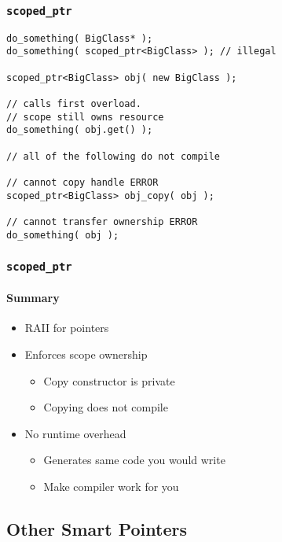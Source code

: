 \begin{frame}[fragile]
    \frametitle{\texttt{scoped\_ptr}}
    \begin{lstlisting}[title=Compile time enforcement]
do_something( BigClass* );
do_something( scoped_ptr<BigClass> ); // illegal

scoped_ptr<BigClass> obj( new BigClass );

// calls first overload.
// scope still owns resource
do_something( obj.get() );

// all of the following do not compile

// cannot copy handle ERROR
scoped_ptr<BigClass> obj_copy( obj );

// cannot transfer ownership ERROR
do_something( obj );
    \end{lstlisting}
\end{frame}

\begin{frame}[fragile]
    \frametitle{\texttt{scoped\_ptr}}
    \framesubtitle{Summary}
    \begin{itemize}
        \item RAII for pointers
        \item Enforces scope ownership
            \begin{itemize}
                \item Copy constructor is private
                \item Copying does not compile
            \end{itemize}
        \item No runtime overhead
            \begin{itemize}
                \item Generates same code you would write
                \item Make compiler work for you
            \end{itemize}
    \end{itemize}
\end{frame}



\subsection{Other Smart Pointers}
\frame{\subsectionpage}

